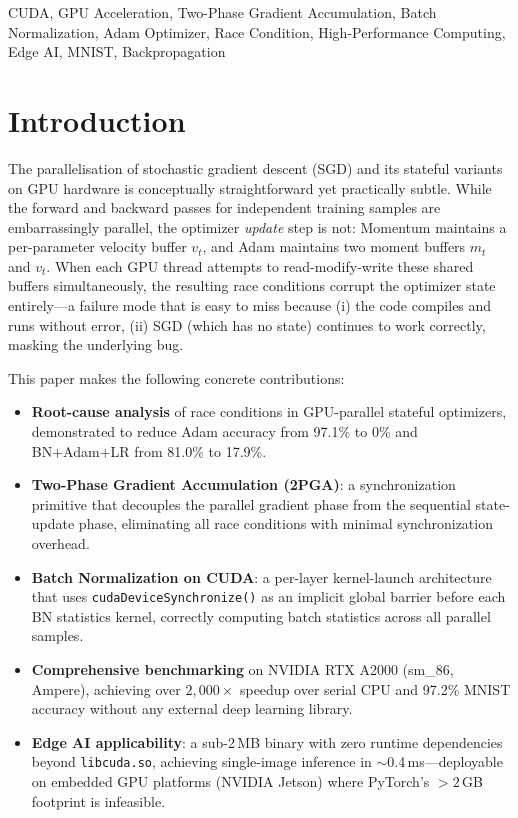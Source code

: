 \documentclass[conference]{IEEEtran}
\begin{document}
\begin{IEEEkeywords}
CUDA, GPU Acceleration, Two-Phase Gradient Accumulation, Batch Normalization, Adam Optimizer, Race Condition, High-Performance Computing, Edge AI, MNIST, Backpropagation
\end{IEEEkeywords}


\section{Introduction}

The parallelisation of stochastic gradient descent (SGD) and its stateful variants on GPU hardware is conceptually straightforward yet practically subtle. While the forward and backward passes for independent training samples are embarrassingly parallel, the optimizer \emph{update} step is not: Momentum maintains a per-parameter velocity buffer $v_t$, and Adam maintains two moment buffers $m_t$ and $v_t$. When each GPU thread attempts to read-modify-write these shared buffers simultaneously, the resulting race conditions corrupt the optimizer state entirely—a failure mode that is easy to miss because (i) the code compiles and runs without error, (ii) SGD (which has no state) continues to work correctly, masking the underlying bug.

This paper makes the following concrete contributions:

\begin{itemize}
  \item \textbf{Root-cause analysis} of race conditions in GPU-parallel stateful optimizers, demonstrated to reduce Adam accuracy from 97.1\% to 0\% and BN+Adam+LR from 81.0\% to 17.9\%.
  \item \textbf{Two-Phase Gradient Accumulation (2PGA)}: a synchronization primitive that decouples the parallel gradient phase from the sequential state-update phase, eliminating all race conditions with minimal synchronization overhead.
  \item \textbf{Batch Normalization on CUDA}: a per-layer kernel-launch architecture that uses \texttt{cudaDeviceSynchronize()} as an implicit global barrier before each BN statistics kernel, correctly computing batch statistics across all parallel samples.
  \item \textbf{Comprehensive benchmarking} on NVIDIA RTX A2000 (sm\_86, Ampere), achieving over $2{,}000\times$ speedup over serial CPU and 97.2\% MNIST accuracy without any external deep learning library.
  \item \textbf{Edge AI applicability}: a sub-2\,MB binary with zero runtime dependencies beyond \texttt{libcuda.so}, achieving single-image inference in $\sim$0.4\,ms—deployable on embedded GPU platforms (NVIDIA Jetson) where PyTorch's $>2$\,GB footprint is infeasible.
\end{itemize}
\end{document}
